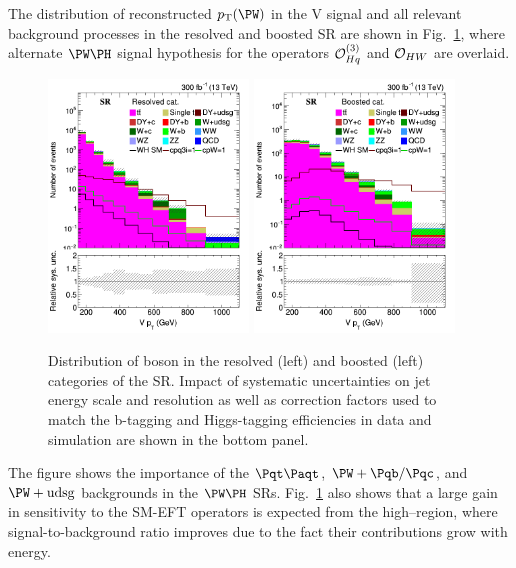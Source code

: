 \documentclass[a4paper,11pt]{article}
\newcommand{\Pb}{{{\Pqb}}\xspace}
\newcommand{\Pt}{{{\Pqt}}\xspace}
\newcommand{\Pc}{{{\Pqc}}\xspace}
\newcommand{\PAt}{{{{\Paqt}}}\xspace}
\renewcommand{\PV}{{{{V}}}\xspace}
\newcommand{\VH}{{{\PV}{\PH}}\xspace}
\begin{document}
The distribution of reconstructed $\pt(\PW)$ in the \VH signal and all relevant background processes in the resolved and boosted SR are shown in Fig.~\ref{fig:RECO_Vpt_WH}, where alternate $\PW\PH$ signal hypothesis for the operators ${\cal O}^{(3)}_{Hq}$ and ${\cal O}_{HW}$  are overlaid. 
\begin{figure}[hbtp]
\begin{center}
\includegraphics[width=0.475\textwidth]{Figures/New/RECO/Plot_Resolved_SR_V_pt_WH.png}
\includegraphics[width=0.475\textwidth]{Figures/New/RECO/Plot_Boosted_SR_V_pt_WH.png}
\end{center}
\caption{
Distribution of \PW boson \pt in the resolved (left) and boosted (left) categories of the SR. Impact of systematic uncertainties on jet energy scale and resolution as well as correction factors used to match the b-tagging and Higgs-tagging efficiencies in data and simulation are shown in the bottom panel.
}
\label{fig:RECO_Vpt_WH}
\end{figure}
The figure shows the importance of the $\Pt\PAt$, ${\PW}+\Pb/\Pc$, and ${\PW}+\textrm{udsg}$ backgrounds in the  $\PW\PH$ SRs.
Fig.~\ref{fig:RECO_Vpt_WH} also shows that a large gain in sensitivity to the SM-EFT operators is expected from the high--\pt region, where signal-to-background ratio improves due to the fact their contributions grow with energy. 
\end{document}
